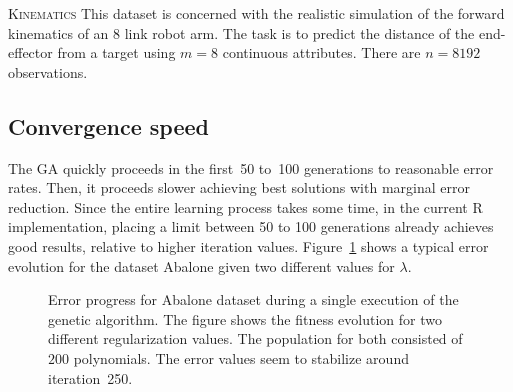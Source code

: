 \documentclass{elsarticle}
\begin{document}
\begin{description}

\item{\textsc{Kinematics}} This dataset is concerned with the realistic simulation of the forward kinematics of an 8 link robot arm. The task is to predict the distance of the end-effector from a target using $m=8$ continuous attributes. There are $n=8192$ observations. 


\end{description}

\subsection{Convergence speed}

The \ac{GA} quickly proceeds in the first~50 to~100 generations to reasonable error rates. Then, it proceeds slower achieving best solutions with marginal error reduction. Since the entire learning process takes some time, in the current R implementation, placing a limit between 50 to 100 generations already achieves good results, relative to higher iteration values. Figure~\ref{Abalone_fitnessProgress} shows a typical error evolution for the dataset Abalone given two different values for $\lambda$.

\begin{figure}[tb]
\begin{center}
\caption{Error progress for Abalone dataset during a single execution of the genetic algorithm. The figure shows the fitness evolution for two different regularization values. The population for both consisted of $200$ polynomials. The error values seem to stabilize around iteration~250.}
\label{Abalone_fitnessProgress}

\end{center}
\end{figure}
\end{document}
